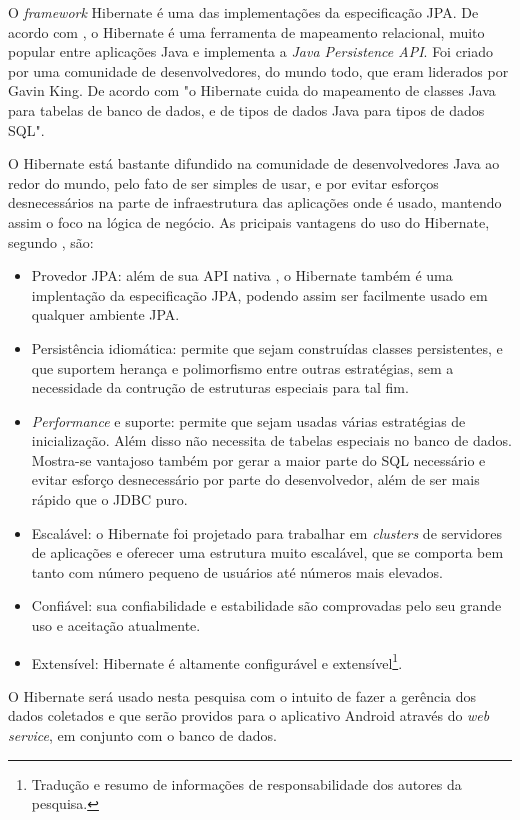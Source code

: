 	\par O \textit{framework} Hibernate é uma das implementações da especificação
JPA. De acordo com , o Hibernate é
uma ferramenta de mapeamento relacional, muito popular entre aplicações
Java e implementa a \textit{Java Persistence API}. Foi criado por uma
comunidade de desenvolvedores, do mundo todo, que eram liderados por Gavin King.
De acordo com  "o Hibernate cuida do mapeamento
de classes Java para tabelas de banco de dados, e de tipos de dados
Java para tipos de dados SQL".

	\par O Hibernate está bastante difundido na comunidade de desenvolvedores Java
ao redor do mundo, pelo fato de ser simples de usar, e por evitar esforços
desnecessários na parte de infraestrutura das aplicações onde é usado, mantendo
assim o foco na lógica de negócio. As pricipais vantagens do uso do Hibernate,
segundo , são:

	\begin{itemize}
	  
		\item Provedor JPA: além de sua API nativa , o Hibernate também é uma
		implentação da especificação JPA, podendo assim ser facilmente usado em
		qualquer ambiente JPA.
		  		
		\item Persistência idiomática: permite que sejam construídas classes
		persistentes, e que suportem herança e polimorfismo entre outras estratégias,
		sem a necessidade da contrução de estruturas especiais para tal fim.
			  	
		\item \textit{Performance} e suporte: permite que sejam usadas várias
		estratégias de inicialização. Além disso não necessita de tabelas especiais
		no banco de dados. Mostra-se vantajoso também por gerar a maior parte do SQL
		necessário e evitar esforço desnecessário por parte do desenvolvedor, além de
		ser mais rápido que o JDBC puro.
		  
		\item Escalável: o Hibernate foi projetado para trabalhar em
		\textit{clusters} de servidores de aplicações e oferecer uma estrutura muito
		escalável, que se comporta bem tanto com número pequeno de usuários até
		números mais elevados.
	
		\item Confiável: sua confiabilidade e estabilidade são comprovadas pelo seu
		grande uso e aceitação atualmente.
				
		\item Extensível: Hibernate é altamente configurável e
		extensível\footnote{Tradução e resumo de informações de responsabilidade dos
		autores da pesquisa.}.
	
	\end{itemize}
	
	\par O Hibernate será usado nesta pesquisa com o intuito de fazer a
gerência dos dados coletados e que serão providos para o aplicativo
Android através do \textit{web service}, em conjunto com o banco de
dados.